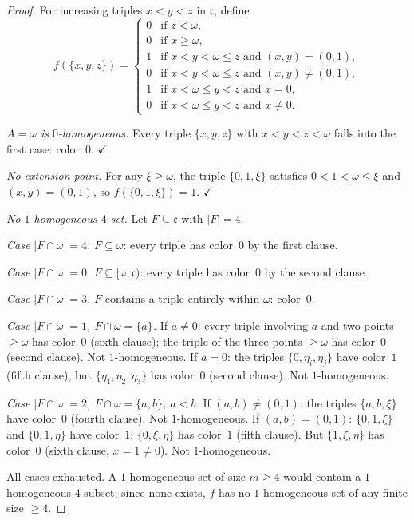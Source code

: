 \documentclass[11pt]{article}
\theoremstyle{definition}
\theoremstyle{remark}
\newcommand{\cc}{\mathfrak{c}}
\begin{document}
\begin{proof}
For increasing triples $x<y<z$ in $\cc$, define
\[
f(\{x,y,z\})=
\begin{cases}
0 & \text{if } z<\omega, \\
0 & \text{if } x\ge\omega, \\
1 & \text{if } x<y<\omega\le z \text{ and } (x,y)=(0,1), \\
0 & \text{if } x<y<\omega\le z \text{ and } (x,y)\ne(0,1), \\
1 & \text{if } x<\omega\le y<z \text{ and } x=0, \\
0 & \text{if } x<\omega\le y<z \text{ and } x\ne 0.
\end{cases}
\]

\emph{$A=\omega$ is $0$-homogeneous.} Every triple $\{x,y,z\}$ with $x<y<z<\omega$ falls into the first case: color~$0$. $\checkmark$

\emph{No extension point.} For any $\xi\ge\omega$, the triple $\{0,1,\xi\}$ satisfies $0<1<\omega\le\xi$ and $(x,y)=(0,1)$, so $f(\{0,1,\xi\})=1$. $\checkmark$

\emph{No $1$-homogeneous $4$-set.} Let $F\subseteq\cc$ with $|F|=4$.

\emph{Case $|F\cap\omega|=4$.} $F\subseteq\omega$: every triple has color~$0$ by the first clause.

\emph{Case $|F\cap\omega|=0$.} $F\subseteq[\omega,\cc)$: every triple has color~$0$ by the second clause.

\emph{Case $|F\cap\omega|=3$.} $F$ contains a triple entirely within $\omega$: color~$0$.

\emph{Case $|F\cap\omega|=1$, $F\cap\omega=\{a\}$.}
If $a\ne 0$: every triple involving $a$ and two points $\ge\omega$ has color~$0$ (sixth clause); the triple of the three points $\ge\omega$ has color~$0$ (second clause). Not $1$-homogeneous.
If $a=0$: the triples $\{0,\eta_i,\eta_j\}$ have color~$1$ (fifth clause), but $\{{\eta_1},{\eta_2},{\eta_3}\}$ has color~$0$ (second clause). Not $1$-homogeneous.

\emph{Case $|F\cap\omega|=2$, $F\cap\omega=\{a,b\}$, $a<b$.}
If $(a,b)\ne(0,1)$: the triples $\{a,b,\xi\}$ have color~$0$ (fourth clause). Not $1$-homogeneous.
If $(a,b)=(0,1)$: $\{0,1,\xi\}$ and $\{0,1,\eta\}$ have color~$1$; $\{0,\xi,\eta\}$ has color~$1$ (fifth clause). But $\{1,\xi,\eta\}$ has color~$0$ (sixth clause, $x=1\ne 0$). Not $1$-homogeneous.

All cases exhausted. A $1$-homogeneous set of size $m\ge 4$ would contain a $1$-homogeneous $4$-subset; since none exists, $f$ has no $1$-homogeneous set of any finite size $\ge 4$.
\end{proof}
\end{document}
